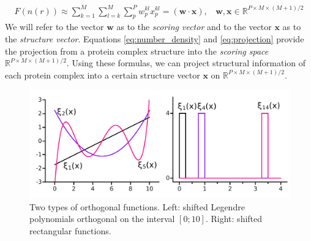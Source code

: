 \begin{eqnarray}
\label{eq:expansion}
F(n(r)) \approx \sum_{k=1}^M\sum_{l=k}^M \sum_{p}^{P} w_{p}^{kl}x_{p}^{kl} = (\mathbf{w} \cdot \mathbf{x}),~~~~\mathbf{w}, \mathbf{x} \in \mathbb{R}^{P \times M \times (M+1)/2}
\end{eqnarray}
We will refer to the vector $\mathbf{w}$ as to the \emph{scoring vector} and to the vector $\mathbf{x}$  as to the  \emph{structure vector}.
Equations \ref{eq:number_density} and \ref{eq:projection} provide the projection from a protein complex  structure into the \emph{scoring space}  $\mathbb{R}^{P \times M \times (M+1)/2}$. 
Using these formulas, we can project structural information of each protein complex into a certain structure vector $ \mathbf{x}$ on  $\mathbb{R}^{P \times M \times (M+1)/2}$. 

\begin{figure}[H]
\begin{center}
\includegraphics[scale=0.5]{Scoring/Fig/Basis_01.pdf}
\caption[Two types of orthogonal functions]{Two types of orthogonal functions. 
Left: shifted Legendre polynomials orthogonal on the interval $[0;10]$.
Right: shifted rectangular functions.
}
\label{fig_Basis} 
\end{center}
\end{figure}





